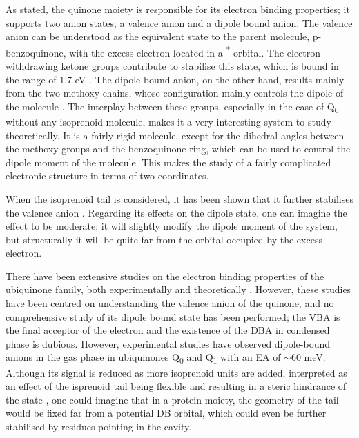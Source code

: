 As stated, the quinone moiety is responsible for its electron binding properties; it supports two anion states, a valence anion and a dipole bound anion. The valence anion can be understood as the equivalent state to the parent molecule, p-benzoquinone, with the excess electron located in a \textpi \textsuperscript{*} orbital. The electron withdrawing ketone groups contribute to stabilise this state, which is bound in the range of 1.7 eV \cite{chen2024low}. The dipole-bound anion, on the other hand, results mainly from the two methoxy chains, whose configuration mainly controls the dipole of the molecule \cite{ameixa2023parent}. The interplay between these groups, especially in the case of Q\textsubscript{0} - without any isoprenoid molecule, makes it a very interesting system to study theoretically. It is a fairly rigid molecule, except for the dihedral angles between the methoxy groups and the benzoquinone ring, which can be used to control the dipole moment of the molecule. This makes the study of a fairly complicated electronic structure in terms of two coordinates.

When the isoprenoid tail is considered, it has been shown that it further stabilises the valence anion \cite{pshenichnyuk2020ionizing}. Regarding its effects on the dipole state, one can imagine the effect to be moderate; it will slightly modify the dipole moment of the system, but structurally it will be quite far from the orbital occupied by the excess electron.

There have been extensive studies on the electron binding properties of the ubiquinone family, both experimentally \cite{ameixa2023parent,west2014anion,pshenichnyuk2020ionizing,bull2015anion} and theoretically \cite{ameixa2023parent,pshenichnyuk2020ionizing,haldar2020multilayer, nonella1998quantum, gamiz2017terminal}. However, these studies have been centred on understanding the valence anion of the quinone, and no comprehensive study of its dipole bound state has been performed; the VBA is the final acceptor of the electron and the existence of the DBA in condensed phase is dubious.
However, experimental studies have observed dipole-bound anions in the gas phase in ubiquinones Q\textsubscript{0} and Q\textsubscript{1} \cite{ameixa2023parent} with an EA of $\mathrm{\sim}$60 meV. Although its signal is reduced as more isoprenoid units are added, interpreted as an effect of the isprenoid tail being flexible and resulting in a steric hindrance of the state \cite{ameixa2023parent,pshenichnyuk2020ionizing}, one could imagine that in a protein moiety, the geometry of the tail would be fixed far from a potential DB orbital, which could even be further stabilised by residues pointing in the cavity.

